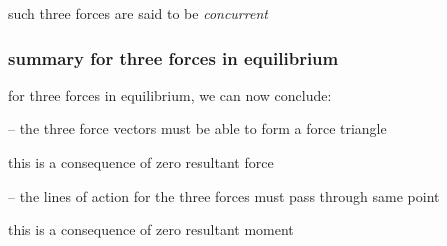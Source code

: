 such three forces are said to be \emph{concurrent}

\subsubsection*{summary for three forces in equilibrium}

for three forces in equilibrium, we can now conclude:

\begin{compactenum}
	\item[--] the three force vectors must be able to form a force triangle
	
	this is a consequence of zero resultant force
	
	\item[--] the lines of action for the three forces must pass through same point
	
	this is a consequence of zero resultant moment
\end{compactenum}





